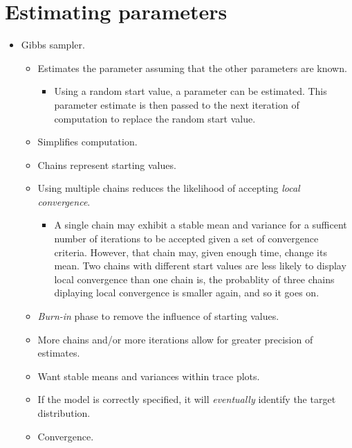\documentclass[]{book}
\providecommand{\tightlist}{%
  \setlength{\itemsep}{0pt}\setlength{\parskip}{0pt}}
\begin{document}
\hypertarget{estimating-parameters}{%
\section{Estimating parameters}\label{estimating-parameters}}

\begin{itemize}
\tightlist
\item
  Gibbs sampler.

  \begin{itemize}
  \tightlist
  \item
    Estimates the parameter assuming that the other parameters are known.

    \begin{itemize}
    \tightlist
    \item
      Using a random start value, a parameter can be estimated. This parameter estimate is then passed to the next iteration of computation to replace the random start value.
    \end{itemize}
  \item
    Simplifies computation.
  \item
    Chains represent starting values.
  \item
    Using multiple chains reduces the likelihood of accepting \emph{local convergence}.

    \begin{itemize}
    \tightlist
    \item
      A single chain may exhibit a stable mean and variance for a sufficent number of iterations to be accepted given a set of convergence criteria. However, that chain may, given enough time, change its mean. Two chains with different start values are less likely to display local convergence than one chain is, the probablity of three chains diplaying local convergence is smaller again, and so it goes on.
    \end{itemize}
  \item
    \emph{Burn-in} phase to remove the influence of starting values.
  \item
    More chains and/or more iterations allow for greater precision of estimates.
  \item
    Want stable means and variances within trace plots.
  \item
    If the model is correctly specified, it will \emph{eventually} identify the target distribution.
  \item
    Convergence.


\end{itemize}
\end{itemize}
\end{document}
